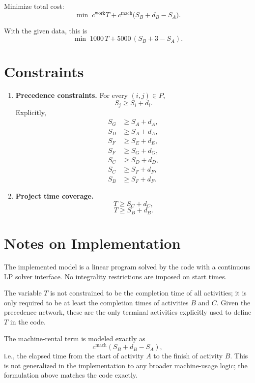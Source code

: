 Minimize total cost:
\[
\min \; c^{\text{work}} T + c^{\text{mach}}\bigl(S_B + d_B - S_A\bigr).
\]

With the given data, this is
\[
\min \; 1000\,T + 5000\,(S_B + 3 - S_A).
\]

\section*{Constraints}

\begin{enumerate}
    \item \textbf{Precedence constraints.} For every $(i,j)\in P$,
    \[
    S_j \ge S_i + d_i.
    \]
    Explicitly,
    \begin{align*}
        S_G &\ge S_A + d_A,\\
        S_D &\ge S_A + d_A,\\
        S_F &\ge S_E + d_E,\\
        S_F &\ge S_G + d_G,\\
        S_C &\ge S_D + d_D,\\
        S_C &\ge S_F + d_F,\\
        S_B &\ge S_F + d_F.
    \end{align*}

    \item \textbf{Project time coverage.}
    \[
    T \ge S_C + d_C,
    \]
    \[
    T \ge S_B + d_B.
    \]
\end{enumerate}

\section*{Notes on Implementation}

The implemented model is a linear program solved by the code with a continuous LP solver interface. No integrality restrictions are imposed on start times.

The variable $T$ is not constrained to be the completion time of all activities; it is only required to be at least the completion times of activities $B$ and $C$. Given the precedence network, these are the only terminal activities explicitly used to define $T$ in the code.

The machine-rental term is modeled exactly as
\[
c^{\text{mach}}(S_B+d_B-S_A),
\]
i.e., the elapsed time from the start of activity $A$ to the finish of activity $B$. This is not generalized in the implementation to any broader machine-usage logic; the formulation above matches the code exactly.
